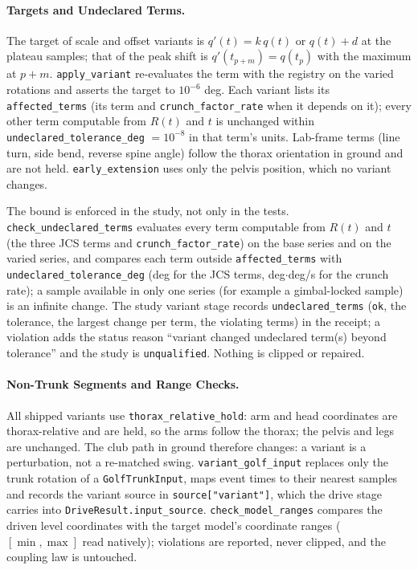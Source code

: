 \paragraph{Targets and Undeclared Terms.}
The target of scale and offset variants is $q'(t)=k\,q(t)$ or $q(t)+d$ at
the plateau samples; that of the peak shift is $q'(t_{p+m}) = q(t_p)$ with the
maximum at $p+m$. \texttt{apply\_variant} re-evaluates the term with the
registry on the varied rotations and asserts the target to $10^{-6}$ deg.
Each variant lists its \texttt{affected\_terms} (its term and
\texttt{crunch\_factor\_rate} when it depends on it); every other term
computable from $R(t)$ and $t$ is unchanged within
\texttt{undeclared\_tolerance\_deg} $=10^{-8}$ in that term's units.
Lab-frame terms (line turn, side bend, reverse spine angle) follow the thorax
orientation in ground and are not held. \texttt{early\_extension} uses only
the pelvis position, which no variant changes.

The bound is enforced in the study, not only in the tests.
\texttt{check\_undeclared\_terms} evaluates every term computable from
$R(t)$ and $t$ (the three JCS terms and \texttt{crunch\_factor\_rate}) on the
base series and on the varied series, and compares each term outside
\texttt{affected\_terms} with \texttt{undeclared\_tolerance\_deg} (deg for the
JCS terms, deg$\cdot$deg/s for the crunch rate); a sample available in only one
series (for example a gimbal-locked sample) is an infinite change. The study
variant stage records \texttt{undeclared\_terms} (\texttt{ok}, the tolerance, the
largest change per term, the violating terms) in the receipt; a violation adds
the status reason ``variant changed undeclared term(s) beyond tolerance'' and
the study is \texttt{unqualified}. Nothing is clipped or repaired.

\paragraph{Non-Trunk Segments and Range Checks.}
All shipped variants use \texttt{thorax\_relative\_hold}: arm and head
coordinates are thorax-relative and are held, so the arms follow the thorax;
the pelvis and legs are unchanged. The club path in ground therefore changes:
a variant is a perturbation, not a re-matched swing. \texttt{variant\_golf\_input}
replaces only the trunk rotation of a \texttt{GolfTrunkInput}, maps event times
to their nearest samples and records the variant source in
\texttt{source["variant"]}, which the drive stage carries into
\texttt{DriveResult.input\_source}. \texttt{check\_model\_ranges} compares the
driven level coordinates with the target model's coordinate ranges
($[\min, \max]$ read natively); violations are reported, never clipped, and
the coupling law is untouched.

